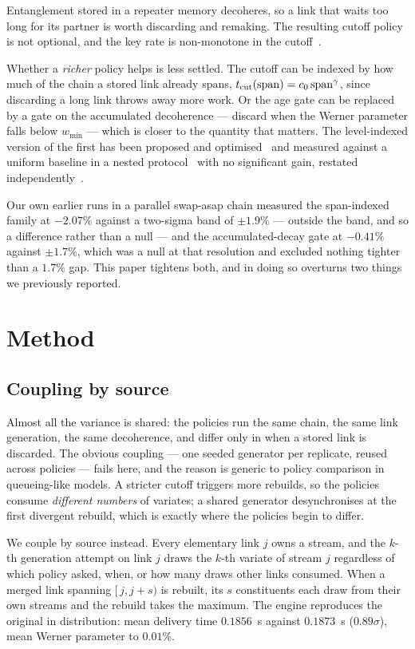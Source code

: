 \documentclass[aps,pra,twocolumn,superscriptaddress,floatfix,nofootinbib]{revtex4-2}
\begin{document}
Entanglement stored in a repeater memory decoheres, so a link that waits too
long for its partner is worth discarding and remaking. The resulting cutoff
policy is not optional, and the key rate is non-monotone in the
cutoff~\cite{Collins2007,Rozpedek2018,Khatri2019,Li2021}.

Whether a \emph{richer} policy helps is less settled. The cutoff can be indexed
by how much of the chain a stored link already spans,
$t_{\rm cut}({\rm span}) = c_0\,{\rm span}^{\gamma}$, since discarding a long
link throws away more work. Or the age gate can be replaced by a gate on the
accumulated decoherence --- discard when the Werner parameter falls below
$w_{\min}$ --- which is closer to the quantity that matters. The level-indexed
version of the first has been proposed and optimised~\cite{Santra2019} and
measured against a uniform baseline in a nested protocol~\cite{Li2021} with no
significant gain, restated independently~\cite{Reiss2023}.

Our own earlier runs in a parallel swap-asap chain measured the span-indexed
family at $-2.07\%$ against a two-sigma band of $\pm1.9\%$ --- outside the band,
and so a difference rather than a null --- and the accumulated-decay gate at
$-0.41\%$ against $\pm1.7\%$, which was a null at that resolution and excluded
nothing tighter than a $1.7\%$ gap. This paper tightens both, and in doing so
overturns two things we previously reported.

\section{Method}

\subsection{Coupling by source}

Almost all the variance is shared: the policies run the same chain, the same
link generation, the same decoherence, and differ only in when a stored link is
discarded. The obvious coupling --- one seeded generator per replicate, reused
across policies --- fails here, and the reason is generic to policy comparison
in queueing-like models. A stricter cutoff triggers more rebuilds, so the
policies consume \emph{different numbers} of variates; a shared generator
desynchronises at the first divergent rebuild, which is exactly where the
policies begin to differ.

We couple by source instead. Every elementary link $j$ owns a stream, and the
$k$-th generation attempt on link $j$ draws the $k$-th variate of stream $j$
regardless of which policy asked, when, or how many draws other links consumed.
When a merged link spanning $[\,j, j+s)$ is rebuilt, its $s$ constituents each
draw from their own streams and the rebuild takes the maximum. The engine
reproduces the original in distribution: mean delivery time $0.1856$~s against
$0.1873$~s ($0.89\sigma$), mean Werner parameter to $0.01\%$.
\end{document}
